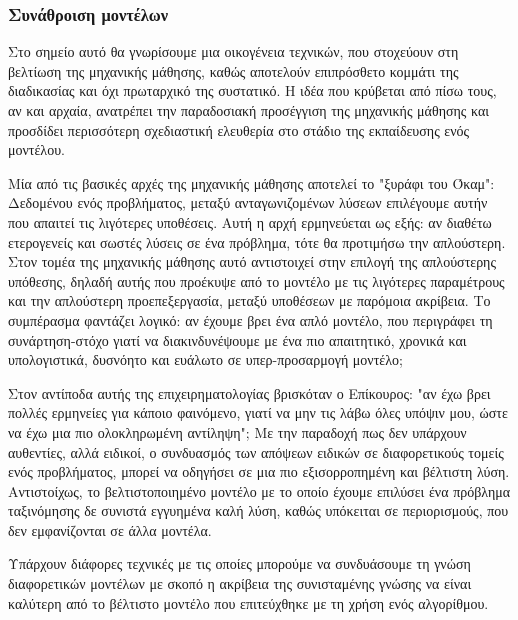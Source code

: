 \subsubsection{Συνάθροιση μοντέλων}
Στο σημείο αυτό θα γνωρίσουμε μια οικογένεια τεχνικών, που στοχεύουν στη βελτίωση της μηχανικής μάθησης, καθώς αποτελούν επιπρόσθετο κομμάτι της διαδικασίας και όχι πρωταρχικό της συστατικό. Η ιδέα που κρύβεται από πίσω τους, αν και αρχαία, ανατρέπει την παραδοσιακή προσέγγιση της μηχανικής μάθησης και προσδίδει περισσότερη σχεδιαστική ελευθερία στο στάδιο της εκπαίδευσης ενός μοντέλου.

Μία από τις βασικές αρχές της μηχανικής μάθησης αποτελεί το "ξυράφι του Όκαμ": Δεδομένου ενός προβλήματος, μεταξύ ανταγωνιζομένων λύσεων επιλέγουμε αυτήν που απαιτεί τις λιγότερες υποθέσεις. Αυτή η αρχή ερμηνεύεται ως εξής: αν διαθέτω ετερογενείς και σωστές λύσεις σε ένα πρόβλημα, τότε θα προτιμήσω την απλούστερη. Στον τομέα της μηχανικής μάθησης αυτό αντιστοιχεί στην επιλογή της απλούστερης υπόθεσης, δηλαδή αυτής που προέκυψε από το μοντέλο με τις λιγότερες
παραμέτρους και την απλούστερη προεπεξεργασία, μεταξύ υποθέσεων με παρόμοια ακρίβεια. Το συμπέρασμα φαντάζει λογικό: αν έχουμε βρει ένα απλό μοντέλο, που περιγράφει τη συνάρτηση-στόχο γιατί να διακινδυνέψουμε με ένα πιο απαιτητικό, χρονικά και υπολογιστικά, δυσνόητο και ευάλωτο σε υπερ-προσαρμογή μοντέλο;

Στον αντίποδα αυτής της επιχειρηματολογίας βρισκόταν ο Επίκουρος: "αν έχω βρει πολλές ερμηνείες για κάποιο φαινόμενο, γιατί να μην τις λάβω όλες υπόψιν μου, ώστε να έχω μια πιο ολοκληρωμένη αντίληψη"; Με την παραδοχή πως δεν υπάρχουν αυθεντίες, αλλά ειδικοί, ο συνδυασμός των απόψεων ειδικών σε διαφορετικούς τομείς ενός προβλήματος, μπορεί να οδηγήσει σε μια πιο εξισορροπημένη και βέλτιστη λύση. Αντιστοίχως, το βελτιστοποιημένο μοντέλο με το οποίο έχουμε επιλύσει ένα πρόβλημα ταξινόμησης δε συνιστά εγγυημένα καλή λύση, καθώς υπόκειται σε περιορισμούς, που δεν εμφανίζονται σε άλλα μοντέλα.

Υπάρχουν διάφορες τεχνικές με τις οποίες μπορούμε να συνδυάσουμε τη γνώση διαφορετικών μοντέλων με σκοπό η ακρίβεια της συνισταμένης γνώσης να είναι καλύτερη από το βέλτιστο μοντέλο που επιτεύχθηκε με τη χρήση ενός αλγορίθμου.

